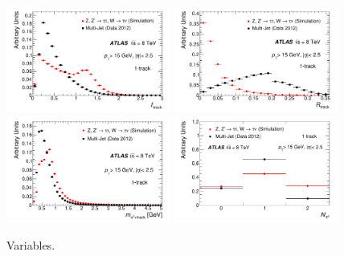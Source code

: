 \begin{figure}[tp]
  \includegraphics[width=0.48\textwidth]{figures/PERF-2013-06/figaux_03}
  \includegraphics[width=0.48\textwidth]{figures/PERF-2013-06/figaux_04}
  \includegraphics[width=0.48\textwidth]{figures/PERF-2013-06/figaux_05}
  \includegraphics[width=0.48\textwidth]{figures/PERF-2013-06/figaux_06}
  \caption{Variables.}
  \label{fig:tauid-inputs-1p}
\end{figure}

